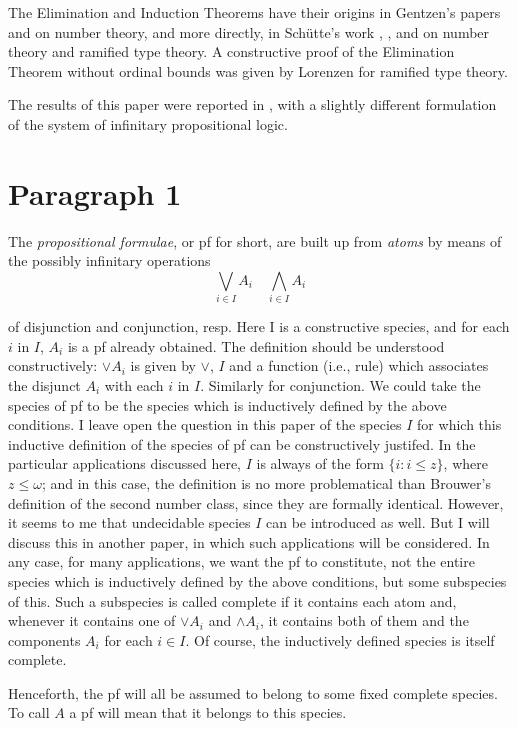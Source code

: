 \documentclass{article}
\begin{document}
The Elimination and Induction Theorems have their origins in Gentzen's papers \cite{gentzenCons} and \cite{gentzenTransfInd} on number theory, and more directly, in Sch\"utte's work \cite{schutte}, \cite{schutteBeweis}, and \cite{schutteBeweisbarkeit} on number theory and ramified type theory. A constructive proof of the Elimination Theorem without ordinal bounds was given by Lorenzen \cite{lorenzen} for ramified type theory.

The results of this paper were reported in \cite{tait}, with a slightly different formulation of the system of infinitary propositional logic.


\section{Paragraph 1}
The \emph{propositional formulae}, or pf for short, are built up from \emph{atoms} by means of the possibly infinitary operations
\[\bigvee\limits_{i\in I} A_i \quad \bigwedge\limits_{i\in I} A_i \]

of disjunction and conjunction, resp. Here I is a constructive species, and for each $i$ in $I$, $A_i$ is a pf already obtained. The definition should be understood constructively: $\vee A_i$ is given by $\vee$, $I$ and a function (i.e., rule) which associates the disjunct $A_i$ with each $i$ in $I$. Similarly for conjunction. We could take the species of pf to be the species which is inductively defined by the above conditions. I leave open the question in this paper of the species $I$ for which this inductive definition of the species of pf can be constructively justifed. In the particular applications discussed here, $I$ is always of the form $\{i:i\leq z\}$, where $z \leq \omega$; and in this case, the definition is no more problematical than Brouwer's definition of the second number class, since they are formally identical. However, it seems to me that undecidable species $I$ can be introduced as well. But I will discuss this in another paper, in which such applications will be considered. In any case, for many applications, we want the pf to constitute, not the entire species which is inductively defined by the above conditions, but some subspecies of this. Such a subspecies is called complete if it contains each atom and, whenever it contains one of $\vee A_i$ and $\wedge A_i$, it contains both of them and the components $A_i$ for each $i \in I$. Of course, the inductively defined species is itself complete.

Henceforth, the pf will all be assumed to belong to some fixed complete species. To call $A$ a pf will mean that it belongs to this species.
\end{document}

